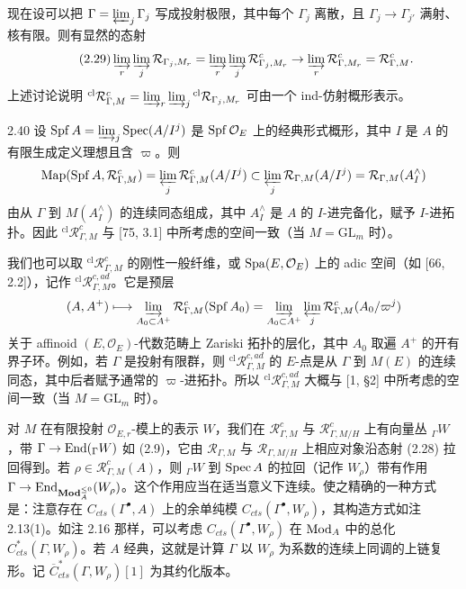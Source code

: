 现在设可以把 $\Gamma = \varprojlim_j \Gamma_j$ 写成投射极限，其中每个 $\Gamma_j$ 离散，且 $\Gamma_j \to \Gamma_{j'}$ 满射、核有限。则有显然的态射
\begin{equation}
\tag{2.29}
\varinjlim_r\varinjlim_j \mathcal R_{\Gamma_j,M_r} = \varinjlim_r\varinjlim_j \mathcal R^c_{\Gamma_j,M_r} \to \varinjlim_r \mathcal R^c_{\Gamma,M_r} = \mathcal R^c_{\Gamma,M}.
\end{equation}
上述讨论说明 ${}^{\mathrm{cl}}\mathcal R^c_{\Gamma,M} = \varinjlim_r\varinjlim_j {}^{\mathrm{cl}}\mathcal R_{\Gamma_j,M_r}$ 可由一个 ind-仿射概形表示。

\begin{rem}{2.40}
设 $\operatorname{Spf} A = \varinjlim_j \operatorname{Spec}(A/I^j)$ 是 $\operatorname{Spf}\mathcal O_E$ 上的经典形式概形，其中 $I$ 是 $A$ 的有限生成定义理想且含 $\varpi$。则
\[
\operatorname{Map}(\operatorname{Spf} A, \mathcal R^c_{\Gamma,M}) = \varprojlim_j \mathcal R^c_{\Gamma,M}(A/I^j) \subset \varprojlim_j \mathcal R_{\Gamma,M}(A/I^j) = \mathcal R_{\Gamma,M}(A^\wedge_I)
\]
由从 $\Gamma$ 到 $M(A^\wedge_I)$ 的连续同态组成，其中 $A^\wedge_I$ 是 $A$ 的 $I$-进完备化，赋予 $I$-进拓扑。因此 ${}^{\mathrm{cl}}\mathcal R^c_{\Gamma,M}$ 与 [75, 3.1] 中所考虑的空间一致（当 $M = \mathrm{GL}_m$ 时）。
\label{rem:zhu2-2-40}
\end{rem}

我们也可以取 ${}^{\mathrm{cl}}\mathcal R^c_{\Gamma,M}$ 的刚性一般纤维，或 $\operatorname{Spa}(E,\mathcal O_E)$ 上的 adic 空间（如 [66, 2.2]），记作 ${}^{\mathrm{cl}}\mathcal R^{c,ad}_{\Gamma,M}$。它是预层
\[
(A,A^+) \longmapsto \varinjlim_{A_0\subset A^+}\mathcal R^c_{\Gamma,M}(\operatorname{Spf} A_0) = \varinjlim_{A_0\subset A^+}\varprojlim_j \mathcal R^c_{\Gamma,M}(A_0/\varpi^j)
\]
关于 affinoid $(E,\mathcal O_E)$-代数范畴上 Zariski 拓扑的层化，其中 $A_0$ 取遍 $A^+$ 的开有界子环。例如，若 $\Gamma$ 是投射有限群，则 ${}^{\mathrm{cl}}\mathcal R^{c,ad}_{\Gamma,M}$ 的 $E$-点是从 $\Gamma$ 到 $M(E)$ 的连续同态，其中后者赋予通常的 $\varpi$-进拓扑。所以 ${}^{\mathrm{cl}}\mathcal R^{c,ad}_{\Gamma,M}$ 大概与 [1, §2] 中所考虑的空间一致（当 $M = \mathrm{GL}_m$ 时）。

对 $M$ 在有限投射 $\mathcal O_{E,r}$-模上的表示 $W$，我们在 $\mathcal R^c_{\Gamma,M}$ 与 $\mathcal R^c_{\Gamma,M/H}$ 上有向量丛 ${}_\Gamma W$，带 $\Gamma \to \operatorname{End}({}_\Gamma W)$ 如 (2.9)，它由 $\mathcal R_{\Gamma,M}$ 与 $\mathcal R_{\Gamma,M/H}$ 上相应对象沿态射 (2.28) 拉回得到。若 $\rho \in \mathcal R^c_{\Gamma,M}(A)$，则 ${}_\Gamma W$ 到 $\operatorname{Spec} A$ 的拉回（记作 $W_\rho$）带有作用 $\Gamma \to \operatorname{End}_{\mathbf{Mod}^{\le 0}_A}(W_\rho)$。这个作用应当在适当意义下连续。使之精确的一种方式是：注意存在 $C_{cts}(\Gamma^\bullet,A)$ 上的余单纯模 $C_{cts}(\Gamma^\bullet,W_\rho)$，其构造方式如注 2.13(1)。如注 2.16 那样，可以考虑 $C_{cts}(\Gamma^\bullet,W_\rho)$ 在 $\operatorname{Mod}_A$ 中的总化 $C^*_{cts}(\Gamma,W_\rho)$。若 $A$ 经典，这就是计算 $\Gamma$ 以 $W_\rho$ 为系数的连续上同调的上链复形。记 $\overline{C}^*_{cts}(\Gamma,W_\rho)[1]$ 为其约化版本。

